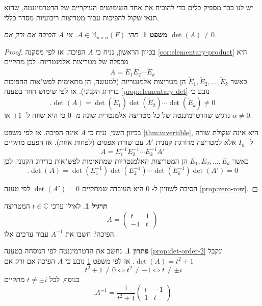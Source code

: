 \documentclass[12pt]{report}
\theoremstyle{plain}
\newtheorem{theorem}{משפט}[chapter]
\theoremstyle{definition}
\newtheorem{exercise}{תרגיל}[chapter]
\newtheorem*{solution}{פתרון}
\newcommand{\C}{\mathbb{C}}
\newcommand{\M}{\mathbb{M}}
\newcommand{\0}{\mathbf{0}}
\begin{document}
יש לנו כבר מספיק כלים כדי להוכיח את אחד השימושים העיקריים של הדטרמיננטה, שהוא תנאי שקול להפיכות עבור מטריצות ריבועיות מסדר כללי.

\begin{theorem}\label{thm:det-invertible}
תהי
$A\in\M_{n\times n}(F)$.
אז 
$A$
הפיכה אם ורק אם
$\det(A)\neq 0$.
\end{theorem}

\begin{proof}
בכיוון הראשון, נניח כי
$A$
הפיכה. אז לפי מסקנה
\ref{cor:elementary-product}
היא מכפלה של מטריצות אלמנטריות. לכן מתקיים
$$
A=\tilde{E}_1\tilde{E}_2\cdots \tilde{E}_k
$$
כאשר
$\tilde{E}_1,\tilde{E}_2,...,\tilde{E}_k$
הן מטריצות אלמנטריות
(למעשה, הן מתאימות לפש"אות ההפוכות בדירוג הקנוני).
אז לפי שימוש חוזר בטענה
\ref{prop:elementary-det}
נובע כי
$$
.\det(A)=\det(\tilde{E}_1)\det(\tilde{E}_2)\cdots\det(\tilde{E}_k)\neq 0
$$
נדגיש שהדטרמיננטה של כל מטריצה אלמנטרית שונה מ-
$0$
כי היא שווה ל- 
$\pm 1$
או
$\alpha\neq 0$.

בכיוון השני, נניח כי
$A$
אינה הפיכה. אז לפי משפט
\ref{thm:invertible},
היא אינה שקולת שורה ל-
$I_n$
אלא למטריצה מדורגת קנונית 
$A'$
עם שורת אפסים (לפחות אחת).
אז הפעם מתקיים
$$
A=E_1^{-1}E_2^{-1}\cdots E_k^{-1}A'
$$
כאשר
$E_1,E_2,...,E_k$
הן המטריצות האלמנטריות שמתאימות לפש"אות בדירוג הקנוני. לכן
$$
.\det(A)=\det(E_1^{-1})\det(E_2^{-1})\cdots\det(E_k^{-1})\det(A')=0
$$

הסיבה לשוויון ל-
$0$
היא העובדה שמתקיים
$\det(A')=0$
לפי טענה
\ref{prop:zero-row}.
\end{proof}

\begin{exercise}
לאילו ערכי
$t\in\C$
המטריצה
$$
A=\begin{pmatrix}
t & 1 \\
-1 & t
\end{pmatrix}
$$
הפיכה? חשבו את
$A^{-1}$
עבור ערכים אלו.
\end{exercise}

\begin{solution}
נחשב את הדטרמיננטה לפי הנוסחה בטענה
\ref{prop:det-order-2}
ונקבל
$.\det(A)=t^2+1$
אז לפי משפט
\ref{thm:det-invertible}
נובע כי 
$A$
הפיכה אם ורק אם
$$
.t^2+1\neq 0 \iff t^2\neq-1 \iff t\neq\pm i
$$
בנוסף, לכל
$t\neq\pm i$
מתקיים
$$
.A^{-1}=\frac{1}{t^2+1}\begin{pmatrix}
t & -1 \\
1 & t
\end{pmatrix}
$$

\end{solution}
\end{document}
